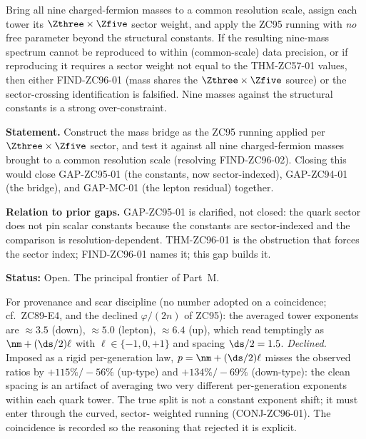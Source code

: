 \documentclass[12pt, a4paper]{article}
\begin{document}
\begin{fsbox}[title={FS-M-03: Falsification Signature for CONJ-ZC96-01}]
Bring all nine charged-fermion masses to a common resolution scale, assign each
tower its $\Zthree\times\Zfive$ sector weight, and apply the ZC95 running with
\emph{no} free parameter beyond the structural constants. If the resulting
nine-mass spectrum cannot be reproduced to within (common-scale) data precision,
or if reproducing it requires a sector weight not equal to the THM-ZC57-01
values, then either FIND-ZC96-01 (mass shares the $\Zthree\times\Zfive$ source)
or the sector-crossing identification is falsified. Nine masses against the
structural constants is a strong over-constraint.
\end{fsbox}

\begin{openqbox}[title={GAP-ZC96-01: The Sector-Indexed, Common-Scale Bridge
  (Priority 1 --- handed to ZC97)}]
\textbf{Statement.} Construct the mass bridge as the ZC95 running applied per
$\Zthree\times\Zfive$ sector, and test it against all nine charged-fermion
masses brought to a common resolution scale (resolving FIND-ZC96-02). Closing
this would close GAP-ZC95-01 (the constants, now sector-indexed), GAP-ZC94-01
(the bridge), and GAP-MC-01 (the lepton residual) together.

\textbf{Relation to prior gaps.} GAP-ZC95-01 is clarified, not closed: the quark
sector does not pin scalar constants because the constants are sector-indexed
and the comparison is resolution-dependent. THM-ZC96-01 is the obstruction that
forces the sector index; FIND-ZC96-01 names it; this gap builds it.

\textbf{Status:} Open. The principal frontier of Part~M.
\end{openqbox}

\begin{openqbox}[title={OBS-ZC96-01: A Clean-Looking Coincidence, Declined}]
For provenance and scar discipline (no number adopted on a coincidence; cf.\
ZC89-E4, and the declined $\varphi/(2n)$ of ZC95): the averaged tower exponents
are $\approx3.5$ (down), $\approx5.0$ (lepton), $\approx6.4$ (up), which read
temptingly as $\nm+(\ds/2)\ell$ with $\ell\in\{-1,0,+1\}$ and spacing
$\ds/2=1.5$. \emph{Declined.} Imposed as a rigid per-generation law,
$p=\nm+(\ds/2)\ell$ misses the observed ratios by $+115\%/-56\%$ (up-type) and
$+134\%/-69\%$ (down-type): the clean spacing is an artifact of averaging two
very different per-generation exponents within each quark tower. The true split
is not a constant exponent shift; it must enter through the curved, sector-
weighted running (CONJ-ZC96-01). The coincidence is recorded so the reasoning
that rejected it is explicit.
\end{openqbox}
\end{document}
